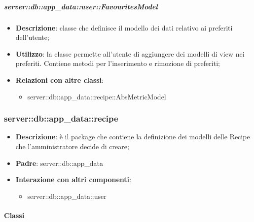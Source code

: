 		\subparagraph{server::db::app\_data::user::FavouritesModel} %
		\label{subp:server_db_app_data_user_favorites}
			\begin{itemize}
				\item \textbf{Descrizione}: classe che definisce il modello dei dati relativo ai preferiti dell'utente;
				\item \textbf{Utilizzo}: la classe  permette all'utente di aggiungere dei modelli di view nei preferiti. Contiene metodi per l'inserimento e rimozione di preferiti;
				\item \textbf{Relazioni con altre classi}:
					\begin{itemize}
						\item server::db::app\_data::recipe::AbsMetricModel
					\end{itemize}
			\end{itemize}


\subsubsection{server::db::app\_data::recipe} %
\label{ssub:bdsm_app_server_app_data_recipe}

	\begin{itemize}
		\item \textbf{Descrizione}: è il package che contiene la definizione dei modelli delle Recipe che l'amministratore decide di creare;
		\item \textbf{Padre}: server::db::app\_data
		\item \textbf{Interazione con altri componenti}:
			\begin{itemize}
				\item server::db::app\_data::user
			\end{itemize}
	\end{itemize}


	\paragraph{Classi} %

